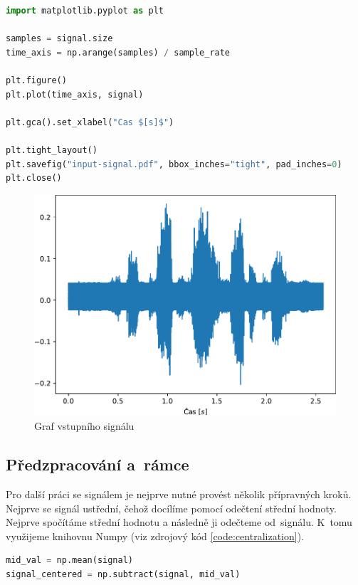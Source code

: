 \documentclass[a4paper, 11pt, final]{article}
\begin{document}
\begin{lstlisting}[language=Python, caption=Vykreslení grafu signálu do PDF souboru, label={code:plot-signal}]
import matplotlib.pyplot as plt

samples = signal.size
time_axis = np.arange(samples) / sample_rate

plt.figure()
plt.plot(time_axis, signal)

plt.gca().set_xlabel("Cas $[s]$")

plt.tight_layout()
plt.savefig("input-signal.pdf", bbox_inches="tight", pad_inches=0)
plt.close()
\end{lstlisting}

\begin{figure}[ht]
    \centering
    \includegraphics{img/01-input-signal.pdf}
    \caption{Graf vstupního signálu}
    \label{fig:signal-graph}
\end{figure}

\subsection{Předzpracování a~rámce}

Pro další práci se signálem je nejprve nutné provést několik přípravných kroků. Nejprve se signál ustřední, čehož docílíme pomocí odečtení střední hodnoty. Nejprve spočítáme střední hodnotu a následně ji odečteme od~signálu. K~tomu využijeme knihovnu Numpy \cite{numpy-reference} (viz zdrojový kód \ref{code:centralization}).

\begin{lstlisting}[language=Python, caption=Ustřednění signálu, label={code:centralization}]
mid_val = np.mean(signal)
signal_centered = np.subtract(signal, mid_val)
\end{lstlisting}
\end{document}
